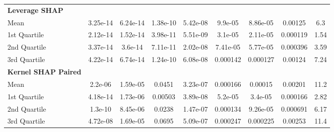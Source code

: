 {\begin{tabular} {lcccccccc}
\addlinespace[1ex] 
\textbf{Leverage SHAP} &  &  &  &  &  &  &  &  \\ 
\hspace{7pt}Mean & \cellcolor{bronze!60}3.25e-14 & \cellcolor{bronze!60}6.24e-14 & \cellcolor{gold!60}1.38e-10 & \cellcolor{gold!60}5.42e-08 & \cellcolor{gold!60}9.9e-05 & \cellcolor{gold!60}8.86e-05 & \cellcolor{gold!60}0.00125 & \cellcolor{gold!60}6.3 \\ 
\hspace{7pt}1st Quartile & \cellcolor{silver!60}2.12e-14 & \cellcolor{bronze!60}1.52e-14 & \cellcolor{bronze!60}3.98e-11 & \cellcolor{gold!60}5.51e-09 & \cellcolor{gold!60}3.1e-05 & \cellcolor{gold!60}2.11e-05 & \cellcolor{gold!60}0.000119 & \cellcolor{gold!60}1.54 \\ 
\hspace{7pt}2nd Quartile & \cellcolor{silver!60}3.37e-14 & \cellcolor{silver!60}3.6e-14 & \cellcolor{silver!60}7.11e-11 & \cellcolor{gold!60}2.02e-08 & \cellcolor{gold!60}7.41e-05 & \cellcolor{gold!60}5.77e-05 & \cellcolor{gold!60}0.000396 & \cellcolor{gold!60}3.59 \\ 
\hspace{7pt}3rd Quartile & \cellcolor{bronze!60}4.22e-14 & \cellcolor{silver!60}6.74e-14 & \cellcolor{gold!60}1.24e-10 & \cellcolor{gold!60}6.08e-08 & \cellcolor{gold!60}0.000142 & \cellcolor{gold!60}0.000127 & \cellcolor{gold!60}0.00124 & \cellcolor{gold!60}7.24 \\ 
\addlinespace[1ex] 
\textbf{Kernel SHAP Paired} &  &  &  &  &  &  &  &  \\ 
\hspace{7pt}Mean & 2.2e-06 & 1.59e-05 & 0.0451 & \cellcolor{silver!60}3.23e-07 & \cellcolor{bronze!60}0.000166 & \cellcolor{bronze!60}0.00015 & \cellcolor{bronze!60}0.00201 & \cellcolor{bronze!60}11.2 \\ 
\hspace{7pt}1st Quartile & 4.18e-14 & 1.73e-06 & 0.00503 & \cellcolor{bronze!60}3.89e-08 & \cellcolor{silver!60}5.2e-05 & \cellcolor{silver!60}3.4e-05 & \cellcolor{silver!60}0.000166 & \cellcolor{bronze!60}2.82 \\ 
\hspace{7pt}2nd Quartile & 1.3e-10 & 8.45e-06 & 0.0238 & \cellcolor{bronze!60}1.47e-07 & \cellcolor{bronze!60}0.000134 & \cellcolor{bronze!60}9.26e-05 & \cellcolor{silver!60}0.000691 & \cellcolor{bronze!60}6.17 \\ 
\hspace{7pt}3rd Quartile & 4.72e-08 & 1.69e-05 & 0.0695 & \cellcolor{bronze!60}5.09e-07 & \cellcolor{bronze!60}0.000247 & \cellcolor{bronze!60}0.000225 & \cellcolor{bronze!60}0.00253 & \cellcolor{bronze!60}11.4 \\ 

\end{tabular}}
